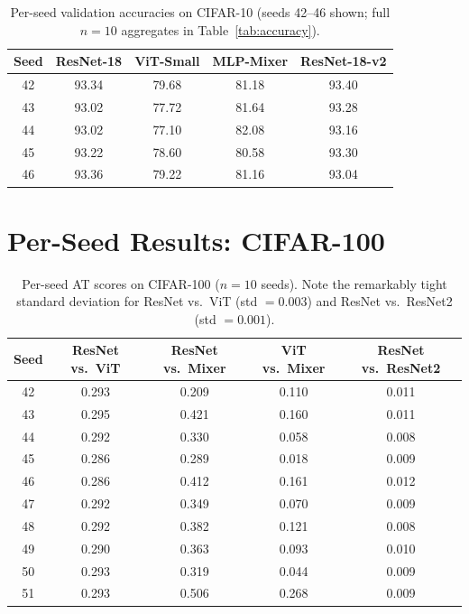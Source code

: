 \documentclass{article}
\begin{document}
\begin{table}[t]
\caption{Per-seed validation accuracies on CIFAR-10 (seeds 42--46 shown; full $n{=}10$ aggregates in Table~\ref{tab:accuracy}).}
\label{tab:per_seed_acc}
\centering
\small
\begin{tabular}{@{}ccccc@{}}
\toprule
Seed & ResNet-18 & ViT-Small & MLP-Mixer & ResNet-18-v2 \\
\midrule
42 & 93.34 & 79.68 & 81.18 & 93.40 \\
43 & 93.02 & 77.72 & 81.64 & 93.28 \\
44 & 93.02 & 77.10 & 82.08 & 93.16 \\
45 & 93.22 & 78.60 & 80.58 & 93.30 \\
46 & 93.36 & 79.22 & 81.16 & 93.04 \\
\bottomrule
\end{tabular}
\end{table}

\section{Per-Seed Results: CIFAR-100}
\label{app:seeds_c100}

\begin{table}[t]
\caption{Per-seed AT scores on CIFAR-100 ($n{=}10$ seeds). Note the remarkably tight standard deviation for ResNet vs.\ ViT (std $= 0.003$) and ResNet vs.\ ResNet2 (std $= 0.001$).}
\label{tab:per_seed_c100}
\centering
\small
\begin{tabular}{@{}ccccc@{}}
\toprule
Seed & ResNet vs.\ ViT & ResNet vs.\ Mixer & ViT vs.\ Mixer & ResNet vs.\ ResNet2 \\
\midrule
42 & 0.293 & 0.209 & 0.110 & 0.011 \\
43 & 0.295 & 0.421 & 0.160 & 0.011 \\
44 & 0.292 & 0.330 & 0.058 & 0.008 \\
45 & 0.286 & 0.289 & 0.018 & 0.009 \\
46 & 0.286 & 0.412 & 0.161 & 0.012 \\
47 & 0.292 & 0.349 & 0.070 & 0.009 \\
48 & 0.292 & 0.382 & 0.121 & 0.008 \\
49 & 0.290 & 0.363 & 0.093 & 0.010 \\
50 & 0.293 & 0.319 & 0.044 & 0.009 \\
51 & 0.293 & 0.506 & 0.268 & 0.009 \\
\bottomrule
\end{tabular}
\end{table}
\end{document}
